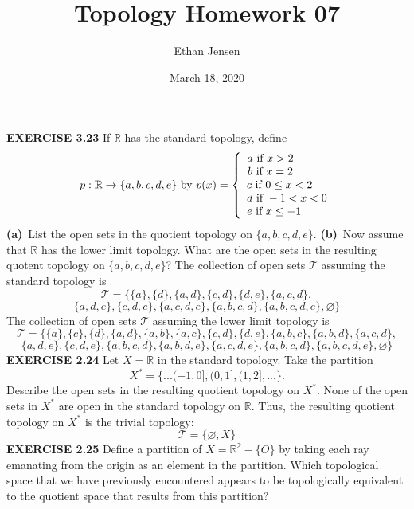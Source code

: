 \documentclass[12pt]{article}
\title{Topology Homework 07}
\author{Ethan Jensen}
\date{March 18, 2020}
\begin{document}
  \maketitle
  \noindent
  \textbf{EXERCISE 3.23}
  If \(\mathbb{R}\) has the standard topology, define
  \[p:\mathbb{R}\rightarrow \{a,b,c,d,e\} \textup{ by } p(x) = \left\{\begin{array}{ccc}
  a \textup{ if } x > 2 \ \ \ \ \ \ \ \ \ \\
  b \textup{ if } x = 2 \ \ \ \ \ \ \ \ \ \\
  c \textup{ if } 0 \leq x < 2 \ \ \ \ \\
  d \textup{ if } -1 < x < 0 \\
  e \textup{ if } x \leq -1 \ \ \ \ \ \ \
  \end{array}\right.\]
  \textbf{(a)}\ List the open sets in the quotient topology on \(\{a,b,c,d,e\}\).
  \newline
  \textbf{(b)}\ Now assume that \(\mathbb{R}\) has the lower limit topology. What are the open sets in the resulting quotent topology on \(\{a,b,c,d,e\}\)?
  \newline \newline
  The collection of open sets \(\mathcal{T}\) assuming the standard topology is
  \[\mathcal{T} = \{\{a\},\{d\},\{a,d\},\{c,d\},\{d,e\},\{a,c,d\},\]
  \[\{a,d,e\},\{c,d,e\},\{a,c,d,e\},\{a,b,c,d\},\{a,b,c,d,e\},\varnothing\}\]
  \newline
  The collection of open sets \(\mathcal{T}\) assuming the lower limit topology is
  \[\mathcal{T} = \{\{a\},\{c\},\{d\},\{a,d\},\{a,b\},\{a,c\},\{c,d\},\{d,e\},\{a,b,c\},\{a,b,d\},\{a,c,d\},\]
  \[\{a,d,e\},\{c,d,e\},\{a,b,c,d\},\{a,b,d,e\},\{a,c,d,e\},\{a,b,c,d\},\{a,b,c,d,e\},\varnothing\}\]
  \newpage
  \noindent
  \textbf{EXERCISE 2.24}
  Let \(X = \mathbb{R}\) in the standard topology. Take the partition
  \[X^*=\{...(-1,0],(0,1],(1,2],...\}.\]
  Describe the open sets in the resulting quotient topology on \(X^*\).
  \newline \newline
  None of the open sets in \(X^*\) are open in the standard topology on \(\mathbb{R}\).
  \newline
  Thus, the resulting quotient topology on \(X^*\) is the trivial topology:
  \[\mathcal{T} = \{\varnothing, X\}\]
  \newpage
  \noindent
  \textbf{EXERCISE 2.25}
  Define a partition of \(X = \mathbb{R^2} - \{O\}\) by taking each ray emanating from the origin as an element in the partition. Which topological space that we have previously encountered appears to be topologically equivalent to the quotient space that results from this partition?
\end{document}
